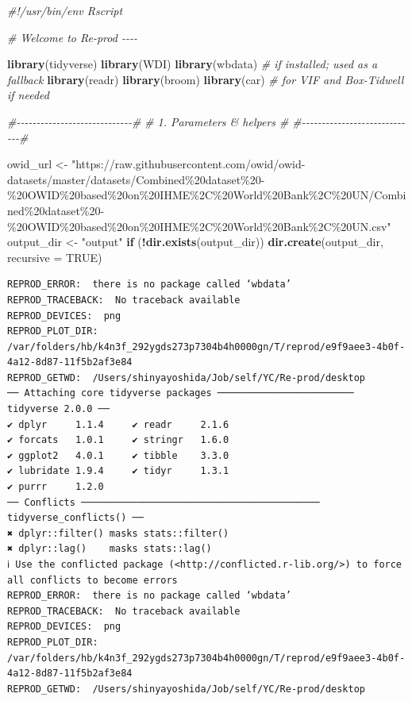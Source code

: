 \documentclass[
  11pt,
]{article}
\newenvironment{Shaded}{\begin{snugshade}}{\end{snugshade}}
\newcommand{\AttributeTok}[1]{\textcolor[rgb]{0.13,0.29,0.53}{#1}}
\newcommand{\CommentTok}[1]{\textcolor[rgb]{0.56,0.35,0.01}{\textit{#1}}}
\newcommand{\ConstantTok}[1]{\textcolor[rgb]{0.56,0.35,0.01}{#1}}
\newcommand{\ControlFlowTok}[1]{\textcolor[rgb]{0.13,0.29,0.53}{\textbf{#1}}}
\newcommand{\FunctionTok}[1]{\textcolor[rgb]{0.13,0.29,0.53}{\textbf{#1}}}
\newcommand{\NormalTok}[1]{#1}
\newcommand{\OtherTok}[1]{\textcolor[rgb]{0.56,0.35,0.01}{#1}}
\newcommand{\SpecialCharTok}[1]{\textcolor[rgb]{0.81,0.36,0.00}{\textbf{#1}}}
\newcommand{\StringTok}[1]{\textcolor[rgb]{0.31,0.60,0.02}{#1}}
\newenvironment{rpoutput}{\vspace{0.5em}\begin{snugshade}}{\end{snugshade}}
\begin{document}
\begin{Shaded}
\begin{Highlighting}[]
\CommentTok{\#!/usr/bin/env Rscript}

\CommentTok{\# Welcome to Re{-}prod {-}{-}{-}{-}}

\FunctionTok{library}\NormalTok{(tidyverse)}
\FunctionTok{library}\NormalTok{(WDI)}
\FunctionTok{library}\NormalTok{(wbdata)       }\CommentTok{\# if installed; used as a fallback}
\FunctionTok{library}\NormalTok{(readr)}
\FunctionTok{library}\NormalTok{(broom)}
\FunctionTok{library}\NormalTok{(car)          }\CommentTok{\# for VIF and Box{-}Tidwell if needed}

\CommentTok{\#{-}{-}{-}{-}{-}{-}{-}{-}{-}{-}{-}{-}{-}{-}{-}{-}{-}{-}{-}{-}{-}{-}{-}{-}{-}{-}{-}{-}{-}\#}
\CommentTok{\# 1. Parameters \& helpers     \#}
\CommentTok{\#{-}{-}{-}{-}{-}{-}{-}{-}{-}{-}{-}{-}{-}{-}{-}{-}{-}{-}{-}{-}{-}{-}{-}{-}{-}{-}{-}{-}{-}\#}

\NormalTok{owid\_url }\OtherTok{\textless{}{-}} \StringTok{"https://raw.githubusercontent.com/owid/owid{-}datasets/master/datasets/Combined\%20dataset\%20{-}\%20OWID\%20based\%20on\%20IHME\%2C\%20World\%20Bank\%2C\%20UN/Combined\%20dataset\%20{-}\%20OWID\%20based\%20on\%20IHME\%2C\%20World\%20Bank\%2C\%20UN.csv"}
\NormalTok{output\_dir }\OtherTok{\textless{}{-}} \StringTok{"output"}
\ControlFlowTok{if}\NormalTok{ (}\SpecialCharTok{!}\FunctionTok{dir.exists}\NormalTok{(output\_dir)) }\FunctionTok{dir.create}\NormalTok{(output\_dir, }\AttributeTok{recursive =} \ConstantTok{TRUE}\NormalTok{)}
\end{Highlighting}
\end{Shaded}

\begin{rpoutput}

\begin{verbatim}
REPROD_ERROR:  there is no package called ‘wbdata’ 
REPROD_TRACEBACK:  No traceback available  
REPROD_DEVICES:  png 
REPROD_PLOT_DIR:  /var/folders/hb/k4n3f_292ygds273p7304b4h0000gn/T/reprod/e9f9aee3-4b0f-4a12-8d87-11f5b2af3e84 
REPROD_GETWD:  /Users/shinyayoshida/Job/self/YC/Re-prod/desktop 
── Attaching core tidyverse packages ──────────────────────── tidyverse 2.0.0 ──
✔ dplyr     1.1.4     ✔ readr     2.1.6
✔ forcats   1.0.1     ✔ stringr   1.6.0
✔ ggplot2   4.0.1     ✔ tibble    3.3.0
✔ lubridate 1.9.4     ✔ tidyr     1.3.1
✔ purrr     1.2.0     
── Conflicts ────────────────────────────────────────── tidyverse_conflicts() ──
✖ dplyr::filter() masks stats::filter()
✖ dplyr::lag()    masks stats::lag()
ℹ Use the conflicted package (<http://conflicted.r-lib.org/>) to force all conflicts to become errors
REPROD_ERROR:  there is no package called ‘wbdata’ 
REPROD_TRACEBACK:  No traceback available  
REPROD_DEVICES:  png 
REPROD_PLOT_DIR:  /var/folders/hb/k4n3f_292ygds273p7304b4h0000gn/T/reprod/e9f9aee3-4b0f-4a12-8d87-11f5b2af3e84 
REPROD_GETWD:  /Users/shinyayoshida/Job/self/YC/Re-prod/desktop 
\end{verbatim}

\end{rpoutput}
\end{document}
